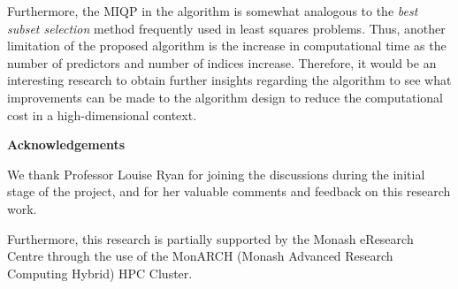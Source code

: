 \documentclass[11pt,a4paper,]{article}
\begin{document}
Furthermore, the MIQP in the algorithm is somewhat analogous to the
\emph{best subset selection} method frequently used in least squares
problems. Thus, another limitation of the proposed algorithm is the
increase in computational time as the number of predictors and number of
indices increase. Therefore, it would be an interesting research to
obtain further insights regarding the algorithm to see what improvements
can be made to the algorithm design to reduce the computational cost in
a high-dimensional context.

\textbf{\large{Acknowledgements}}

We thank Professor Louise Ryan for joining the discussions during the
initial stage of the project, and for her valuable comments and feedback
on this research work.

Furthermore, this research is partially supported by the Monash
eResearch Centre through the use of the MonARCH (Monash Advanced
Research Computing Hybrid) HPC Cluster.

\printbibliography
\end{document}
